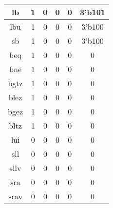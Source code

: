 \documentclass[UTF8]{ctexart}
\begin{document}
\begin{table}[H]
\begin{threeparttable}
\begin{tabular}{|c|c|c|c|c|c|}
			\hline
			lb                                       & 1               & 0             & 0                & 0             & 3'b101            \\
			\hline
			lbu                                      & 1               & 0             & 0                & 0             & 3'b100            \\
			\hline
			sb                                       & 1               & 0             & 0                & 0             & 3'b100            \\
			\hline
			beq                                      & 1               & 0             & 0                & 0             & 0                 \\
			\hline
			bne                                      & 1               & 0             & 0                & 0             & 0                 \\
			\hline
			bgtz                                     & 1               & 0             & 0                & 0             & 0                 \\
			\hline
			blez                                     & 1               & 0             & 0                & 0             & 0                 \\
			\hline
			bgez                                     & 1               & 0             & 0                & 0             & 0                 \\
			\hline
			bltz                                     & 1               & 0             & 0                & 0             & 0                 \\
			\hline
			lui                                      & 0               & 0             & 0                & 0             & 0                 \\
			\hline
			sll                                      & 0               & 0             & 0                & 0             & 0                 \\
			\hline
			sllv                                     & 0               & 0             & 0                & 0             & 0                 \\
			\hline
			sra                                      & 0               & 0             & 0                & 0             & 0                 \\
			\hline
			srav                                     & 0               & 0             & 0                & 0             & 0                 \\

\end{tabular}
\end{threeparttable}
\end{table}
\end{document}
